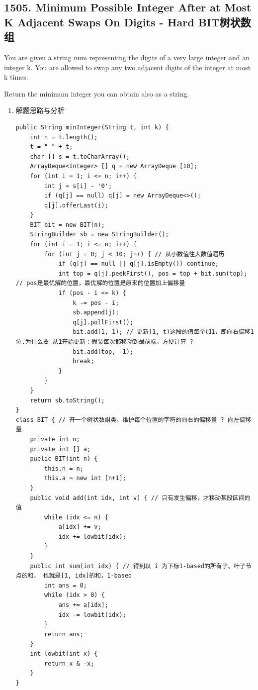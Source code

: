 \documentclass[9pt, b5paaper]{book}
\begin{document}
\subsection{1505. Minimum Possible Integer After at Most K Adjacent Swaps On Digits - Hard BIT树状数组}
\label{sec-1-0-8}
You are given a string num representing the digits of a very large integer and an integer k. You are allowed to swap any two adjacent digits of the integer at most k times.

Return the minimum integer you can obtain also as a string.
\begin{enumerate}
\item 解题思路与分析
\label{sec-1-0-8-1}
\begin{verbatim}
public String minInteger(String t, int k) {
    int n = t.length();
    t = " " + t;
    char [] s = t.toCharArray();
    ArrayDeque<Integer> [] q = new ArrayDeque [10];
    for (int i = 1; i <= n; i++) {
        int j = s[i] - '0';
        if (q[j] == null) q[j] = new ArrayDeque<>();
        q[j].offerLast(i);
    }
    BIT bit = new BIT(n);
    StringBuilder sb = new StringBuilder();
    for (int i = 1; i <= n; i++) {
        for (int j = 0; j < 10; j++) { // 从小数值往大数值遍历
            if (q[j] == null || q[j].isEmpty()) continue;
            int top = q[j].peekFirst(), pos = top + bit.sum(top); // pos是最优解的位置，最优解的位置是原来的位置加上偏移量
            if (pos - i <= k) {
                k -= pos - i;
                sb.append(j);
                q[j].pollFirst();
                bit.add(1, 1); // 更新[1, t)这段的值每个加1，即向右偏移1位.为什么要 从1开始更新：假装每次都移动到最前端，方便计算 ?
                bit.add(top, -1);
                break;
            }
        }
    }
    return sb.toString();
}
class BIT { // 开一个树状数组类，维护每个位置的字符的向右的偏移量 ? 向左偏移量
    private int n;
    private int [] a;
    public BIT(int n) {
        this.n = n;
        this.a = new int [n+1];
    }
    public void add(int idx, int v) { // 只有发生偏移，才移动某段区间的值
        while (idx <= n) {
            a[idx] += v;
            idx += lowbit(idx);
        }
    }
    public int sum(int idx) { // 得到以 i 为下标1-based的所有子、叶子节点的和， 也就是[1, idx]的和，1-based
        int ans = 0;
        while (idx > 0) {
            ans += a[idx];
            idx -= lowbit(idx);
        }
        return ans;
    }
    int lowbit(int x) {
        return x & -x;
    }
}
\end{verbatim}
\end{enumerate}
\end{document}
